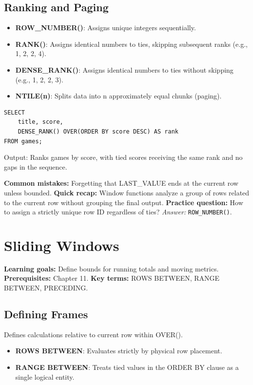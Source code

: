 \documentclass[12pt, a4paper]{article}
\begin{document}
\subsection{Ranking and Paging}
\begin{itemize}
    \item \textbf{ROW\_NUMBER()}: Assigns unique integers sequentially.
    \item \textbf{RANK()}: Assigns identical numbers to ties, skipping subsequent ranks (e.g., 1, 2, 2, 4).
    \item \textbf{DENSE\_RANK()}: Assigns identical numbers to ties without skipping (e.g., 1, 2, 2, 3).
    \item \textbf{NTILE(n)}: Splits data into n approximately equal chunks (paging).
\end{itemize}

\begin{verbatim}
SELECT 
    title, score,
    DENSE_RANK() OVER(ORDER BY score DESC) AS rank
FROM games;
\end{verbatim}
Output: Ranks games by score, with tied scores receiving the same rank and no gaps in the sequence.

\textbf{Common mistakes:} Forgetting that LAST\_VALUE ends at the current row unless bounded.
\textbf{Quick recap:} Window functions analyze a group of rows related to the current row without grouping the final output.
\textbf{Practice question:} How to assign a strictly unique row ID regardless of ties?
\textit{Answer:} \texttt{ROW\_NUMBER()}.

\section{Sliding Windows}
\textbf{Learning goals:} Define bounds for running totals and moving metrics.
\textbf{Prerequisites:} Chapter 11.
\textbf{Key terms:} ROWS BETWEEN, RANGE BETWEEN, PRECEDING.

\subsection{Defining Frames}
Defines calculations relative to current row within OVER().
\begin{itemize}
    \item \textbf{ROWS BETWEEN}: Evaluates strictly by physical row placement.
    \item \textbf{RANGE BETWEEN}: Treats tied values in the ORDER BY clause as a single logical entity.
\end{itemize}
\end{document}

